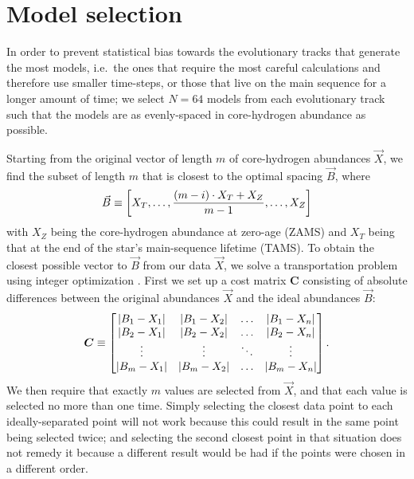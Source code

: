 \documentclass[manuscript]{aastex}
\begin{document}
\section{Model selection}
\label{sec:selection}
In order to prevent statistical bias towards the evolutionary tracks that generate the most models, i.e.~the ones that require the most careful calculations and therefore use smaller time-steps, or those that live on the main sequence for a longer amount of time; we select $N=64$ models from each evolutionary track such that the models are as evenly-spaced in core-hydrogen abundance as possible. 

Starting from the original vector of length $m$ of core-hydrogen abundances $\vec X$, we find the subset of length $m$ that is closest to the optimal spacing $\vec B$, where
\begin{equation}
  \vec B \equiv \qty[
    X_T, 
    \ldots,
    \frac{(m-i)\cdot X_T + X_Z}{m-1}, 
    \ldots, 
    X_Z
  ]
\end{equation}
with $X_Z$ being the core-hydrogen abundance at zero-age (ZAMS) and $X_T$ being that at the end of the star's main-sequence lifetime (TAMS). To obtain the closest possible vector to $\vec B$ from our data $\vec X$, we solve a transportation problem using integer optimization \citep{23145595}. First we set up a cost matrix $\boldsymbol{C}$ consisting of absolute differences between the original abundances $\vec X$ and the ideal abundances $\vec B$:
\begin{equation}
  \boldsymbol C \equiv 
  \begin{bmatrix}
    \abs{B_1-X_1} & \abs{B_1-X_2} & \dots & \abs{B_1-X_n} \\ 
    \abs{B_2-X_1} & \abs{B_2-X_2} & \dots & \abs{B_2-X_n} \\ 
    \vdots & \vdots & \ddots & \vdots\\ 
    \abs{B_m-X_1} & \abs{B_m-X_2} & \dots & \abs{B_m-X_n}
  \end{bmatrix}.
\end{equation}
We then require that exactly $m$ values are selected from $\vec X$, and that each value is selected no more than one time. Simply selecting the closest data point to each ideally-separated point will not work because this could result in the same point being selected twice; and selecting the second closest point in that situation does not remedy it because a different result would be had if the points were chosen in a different order. 
\end{document}
